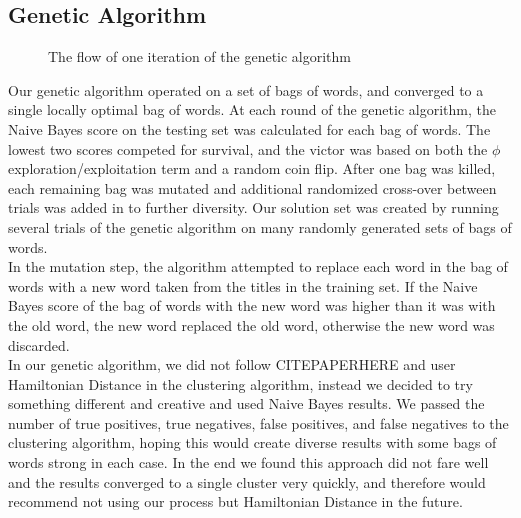 \documentclass{sig-alternate}
\begin{document}
\subsection{Genetic Algorithm}
\begin{figure}[t]
\centering
{}
\caption{The flow of one iteration of the genetic algorithm}
\label{fig:genetic_algo}
\end{figure}
Our genetic algorithm operated on a set of bags of words, and converged to a single locally optimal bag of words. At each round of the genetic algorithm, the Naive Bayes score on the testing set was calculated for each bag of words. The lowest two scores competed for survival, and the victor was based on both the $\phi$ exploration/exploitation term and a random coin flip. After one bag was killed, each remaining bag was mutated and additional randomized cross-over between trials was added in to further diversity. Our solution set was created by running several trials of the genetic algorithm on many randomly generated sets of bags of words.\\
\indent In the mutation step, the algorithm attempted to replace each word in the bag of words with a new word taken from the titles in the training set. If the Naive Bayes score of the bag of words with the new word was higher than it was with the old word, the new word replaced the old word, otherwise the new word was discarded.\\
\indent In our genetic algorithm, we did not follow CITEPAPERHERE and user Hamiltonian Distance in the clustering algorithm, instead we decided to try something different and creative and used Naive Bayes results. We passed the number of true positives, true negatives, false positives, and false negatives to the clustering algorithm, hoping this would create diverse results with some bags of words strong in each case. In the end we found this approach did not fare well and the results converged to a single cluster very quickly, and therefore would recommend not using our process but Hamiltonian Distance in the future.
\end{document}
